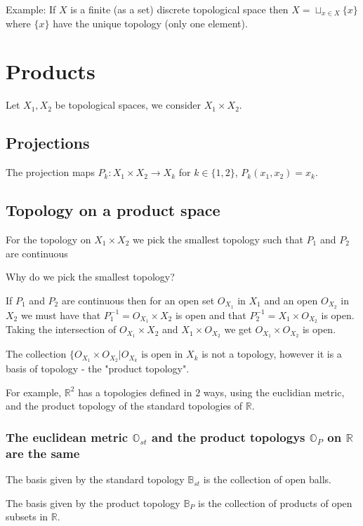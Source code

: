 \documentclass{homework}
\newcommand{\RR}{\mathbb{R}}
\newcommand{\BB}{\mathbb{B}}
\newcommand{\OO}{\mathbb{O}}
\begin{document}
Example: If $X$ is a finite (as a set) discrete topological space then $X = \sqcup_{x \in X} \{x\}$ where $\{x\}$ have the unique topology (only one element).



\section{Products}

Let $X_1,X_2$ be topological spaces, we consider $X_1 \times X_2$. 

\subsection{Projections}
The projection maps $P_k:X_1 \times X_2 \rightarrow X_k$ for $k \in \{1,2\}$, $P_k(x_1,x_2) = x_k$. 

\subsection{Topology on a product space}
For the topology on $X_1 \times X_2$ we pick the smallest topology such that $P_1$ and $P_2$ are continuous

\question Why do we pick the smallest topology?

If $P_1$ and $P_2$ are continuous then for an open set $O_{X_1}$ in $X_1$ and an open $O_{X_2}$ in $X_2$ we must have that $P_1^{-1} = O_{X_1} \times X_2$ is open and that $P_2^{-1} = X_1 \times O_{X_2}$ is open. Taking the intersection of $O_{X_1} \times X_2$ and $X_1 \times O_{X_2}$ we get $O_{X_1} \times O_{X_2}$ is open. 


The collection $\{O_{X_1} \times O_{X_2} | O_{X_k} \text{ is open in } X_k$ is not a topology, however it is a basis of topology - the "product topology".

For example, $\RR^2$ has a topologies defined in $2$ ways, using the euclidian metric, and the product topology of the standard topologies of $\RR$.

\subsubsection{The euclidean metric $\OO_{st}$ and the product topologys $\OO_P$ on $\RR$ are the same}

The basis given by the standard topology $\BB_{st}$ is the collection of open balls.

The basis given by the product topology $\BB_P$ is the collection of products of open subsets in $\RR$.
\end{document}
